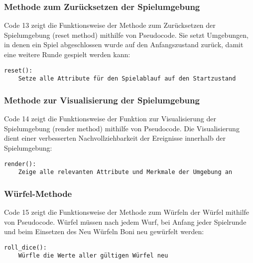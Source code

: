 \subsubsection{Methode zum Zurücksetzen der Spielumgebung}
\begin{minipage}{\linewidth}
Code 13 zeigt die Funktionsweise der Methode zum Zurücksetzen der Spielumgebung (reset method) mithilfe von Pseudocode. Sie setzt Umgebungen, in denen ein Spiel abgeschlossen wurde auf den Anfangszustand zurück, damit eine weitere Runde gespielt werden kann:
\vspace{0.5cm}
\begin{lstlisting}[caption={Methode zum Zurücksetzen der Umgebung}]
reset():
	Setze alle Attribute für den Spielablauf auf den Startzustand
\end{lstlisting}
\end{minipage}

\subsubsection{Methode zur Visualisierung der Spielumgebung}
\begin{minipage}{\linewidth}
Code 14 zeigt die Funktionsweise der Funktion zur Visualisierung der Spielumgebung (render method) mithilfe von Pseudocode. Die Visualisierung dient einer verbesserten Nachvollziehbarkeit der Ereignisse innerhalb der Spielumgebung:
\vspace{0.5cm}
\begin{lstlisting}[caption={Methode zur Visualisierung der Spielumgebung}]
render():
	Zeige alle relevanten Attribute und Merkmale der Umgebung an
\end{lstlisting}
\end{minipage}

\subsubsection{Würfel-Methode}
\begin{minipage}{\linewidth}
Code 15 zeigt die Funktionsweise der Methode zum Würfeln der Würfel mithilfe von Pseudocode. Würfel müssen nach jedem Wurf, bei Anfang jeder Spielrunde und beim Einsetzen des Neu Würfeln Boni neu gewürfelt werden:
\vspace{0.5cm}
\begin{lstlisting}[caption={Methode zum werfen der Würfel}]
roll_dice():
	Würfle die Werte aller gültigen Würfel neu
\end{lstlisting}
\end{minipage}

